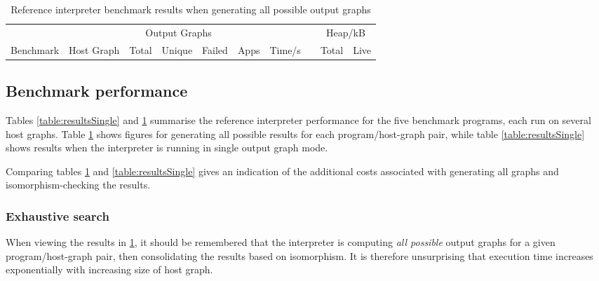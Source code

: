 \begin{table}[h]
\begin{minipage}{\textwidth}
\centering

\begin{tabular}{llrrrrrcrr}
\hline 
&  & \multicolumn{3}{c}{Output Graphs} & & && \multicolumn{2}{c}{Heap/kB}\\
Benchmark          & Host Graph\footnotemark & Total & Unique   & Failed & Apps & Time/s   & & Total  & Live \\
\hline 

\end{tabular}

\caption[Reference interpreter benchmarks]{Reference interpreter benchmark results when generating all possible output graphs}

\label{table:resultsAll}
\end{minipage}
\end{table}


\subsection{Benchmark performance}

Tables \ref{table:resultsSingle} and \ref{table:resultsAll} summarise the reference interpreter performance for the five benchmark programs, each run on several host graphs. Table \ref{table:resultsAll} shows figures for generating all possible results for each program/host-graph pair, while table \ref{table:resultsSingle} shows results when the interpreter is running in single output graph mode.



Comparing tables \ref{table:resultsAll} and \ref{table:resultsSingle} gives an indication of the additional costs associated with generating all graphs and isomorphism-checking the results.




\subsubsection*{Exhaustive search}

When viewing the results in \ref{table:resultsAll}, it should be remembered that the interpreter is computing \textit{all possible} output graphs for a given program/host-graph pair, then consolidating the results based on isomorphism. It is therefore unsurprising that execution time increases exponentially with increasing size of host graph.

